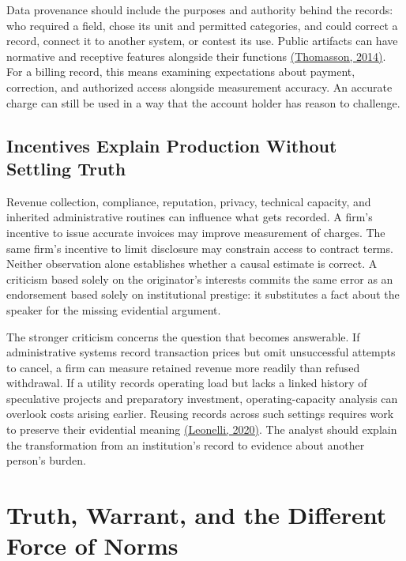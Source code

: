 Data provenance should include the purposes and authority behind the
records: who required a field, chose its unit and permitted categories,
and could correct a record, connect it to another system, or contest its
use. Public artifacts can have normative and receptive features
alongside their functions
\href{https://www.amiethomasson.org/_files/ugd/63fc8a_840cc91860474dfa99802928543989fb.doc}{(Thomasson,
2014)}. For a billing record, this means examining expectations about
payment, correction, and authorized access alongside measurement
accuracy. An accurate charge can still be used in a way that the account
holder has reason to challenge.

\hypertarget{M09-incentives-explain-production-without-settling-truth}{%
\subsection{Incentives Explain Production Without Settling
Truth}\label{M09-incentives-explain-production-without-settling-truth}}

\noindent \noindent Revenue collection, compliance, reputation, privacy, technical
capacity, and inherited administrative routines can influence what gets
recorded. A firm's incentive to issue accurate invoices may improve
measurement of charges. The same firm's incentive to limit disclosure
may constrain access to contract terms. Neither observation alone
establishes whether a causal estimate is correct. A criticism based
solely on the originator's interests commits the same error as an
endorsement based solely on institutional prestige: it substitutes a
fact about the speaker for the missing evidential argument.

The stronger criticism concerns the question that becomes answerable. If
administrative systems record transaction prices but omit unsuccessful
attempts to cancel, a firm can measure retained revenue more readily
than refused withdrawal. If a utility records operating load but lacks a
linked history of speculative projects and preparatory investment,
operating-capacity analysis can overlook costs arising earlier. Reusing
records across such settings requires work to preserve their evidential
meaning
\href{https://link.springer.com/chapter/10.1007/978-3-030-37177-7_1}{(Leonelli,
2020)}. The analyst should explain the transformation from an
institution's record to evidence about another person's burden.


\hypertarget{M09-truth-warrant-and-the-different-force-of-norms}{%
\section{Truth, Warrant, and the Different Force of
Norms}\label{M09-truth-warrant-and-the-different-force-of-norms}}

